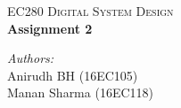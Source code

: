 \documentclass[../main.tex]{subfiles}
\begin{document}
\begin{titlepage}
\newcommand{\HRule}{\rule{\linewidth}{0.5mm}} %

\center %
 

\textsc{\Large EC280 Digital System Design}\\[0.3cm] %


{ \huge \bfseries Assignment 2}\\[0.4cm] %
 

\begin{minipage}{\textwidth}
\begin{flushleft} \large
\emph{Authors:}\\
Anirudh BH (16EC105)\\
Manan Sharma (16EC118)
\end{flushleft}
\end{minipage}

\begin{minipage}{\textwidth}
\begin{flushright} \large
\end{flushright}
\end{minipage}\\[1cm]




\end{titlepage}
\end{document}
